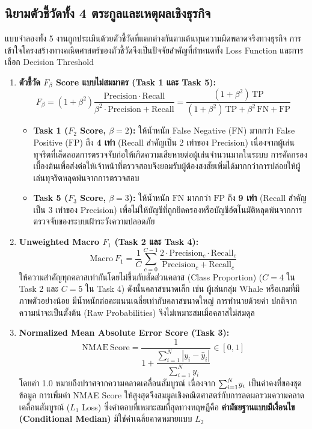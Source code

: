 \documentclass[11pt,a4paper]{article}
\DeclareRobustCommand{\code}[1]{\leavevmode{\ttfamily\color{KeyGreen!85!black}\let\codeunderscore\_\def\_{\codeunderscore\allowbreak}\hyphenpenalty=50\exhyphenpenalty=50\relax#1}}
\begin{document}
\subsection{นิยามตัวชี้วัดทั้ง 4 ตระกูลและเหตุผลเชิงธุรกิจ}

แบบจำลองทั้ง 5 งานถูกประเมินด้วยตัวชี้วัดที่แตกต่างกันตามต้นทุนความผิดพลาดจริงทางธุรกิจ การเข้าใจโครงสร้างทางคณิตศาสตร์ของตัวชี้วัดจึงเป็นปัจจัยสำคัญที่กำหนดทั้ง Loss Function และการเลือก Decision Threshold

\begin{enumerate}
    \item \textbf{ตัวชี้วัด $F_\beta$ Score แบบไม่สมมาตร (Task 1 และ Task 5):}
    \[
    F_\beta = (1 + \beta^2)\frac{\mathrm{Precision} \cdot \mathrm{Recall}}{\beta^2 \cdot \mathrm{Precision} + \mathrm{Recall}} = \frac{(1 + \beta^2)\,\mathrm{TP}}{(1 + \beta^2)\,\mathrm{TP} + \beta^2\,\mathrm{FN} + \mathrm{FP}}
    \]
    \begin{itemize}
        \item \textbf{Task 1 ($F_2$ Score, $\beta=2$):} ให้น้ำหนัก False Negative ($\mathrm{FN}$) มากกว่า False Positive ($\mathrm{FP}$) ถึง \textbf{4 เท่า} (Recall สำคัญเป็น 2 เท่าของ Precision) เนื่องจากผู้เล่นทุจริตที่เล็ดลอดการตรวจจับก่อให้เกิดความเสียหายต่อผู้เล่นจำนวนมากในระบบ การคัดกรองเบื้องต้นเพื่อส่งต่อให้เจ้าหน้าที่ตรวจสอบจึงยอมรับผู้ต้องสงสัยเพิ่มได้มากกว่าการปล่อยให้ผู้เล่นทุจริตหลุดพ้นจากการตรวจสอบ
        \item \textbf{Task 5 ($F_3$ Score, $\beta=3$):} ให้น้ำหนัก $\mathrm{FN}$ มากกว่า $\mathrm{FP}$ ถึง \textbf{9 เท่า} (Recall สำคัญเป็น 3 เท่าของ Precision) เพื่อไม่ให้บัญชีที่ถูกยึดครองหรือบัญชีอัตโนมัติหลุดพ้นจากการตรวจจับของระบบเฝ้าระวังความปลอดภัย
    \end{itemize}

    \item \textbf{Unweighted Macro $F_1$ (Task 2 และ Task 4):}
    \[
    \mathrm{Macro\ } F_1 = \frac{1}{C}\sum_{c=0}^{C-1} \frac{2 \cdot \mathrm{Precision}_c \cdot \mathrm{Recall}_c}{\mathrm{Precision}_c + \mathrm{Recall}_c}
    \]
    ให้ความสำคัญทุกคลาสเท่ากันโดยไม่ขึ้นกับสัดส่วนคลาส (Class Proportion) ($C=4$ ใน Task 2 และ $C=5$ ใน Task 4) ดังนั้นคลาสขนาดเล็ก เช่น ผู้เล่นกลุ่ม Whale หรือเกมที่มีภาพตัวอย่างน้อย มีน้ำหนักต่อคะแนนเฉลี่ยเท่ากับคลาสขนาดใหญ่ การทำนายด้วยค่า \code{argmax} ปกติจากความน่าจะเป็นตั้งต้น (Raw Probabilities) จึงไม่เหมาะสมเมื่อคลาสไม่สมดุล

    \item \textbf{Normalized Mean Absolute Error Score (Task 3):}
    \[
    \mathrm{NMAE\ Score} = \frac{1}{1 + \dfrac{\sum_{i=1}^{N} |y_i - \hat{y}_i|}{\sum_{i=1}^{N} y_i}} \in [0, 1]
    \]
    โดยค่า 1.0 หมายถึงปราศจากความคลาดเคลื่อนสัมบูรณ์ เนื่องจาก $\smash{\sum_{i=1}^N} y_i$ เป็นค่าคงที่ของชุดข้อมูล การเพิ่มค่า NMAE Score ให้สูงสุดจึงสมมูลเชิงคณิตศาสตร์กับการลดผลรวมความคลาดเคลื่อนสัมบูรณ์ ($L_1$ Loss) ซึ่งคำตอบที่เหมาะสมที่สุดทางทฤษฎีคือ \textbf{ค่ามัธยฐานแบบมีเงื่อนไข (Conditional Median)} มิใช่ค่าเฉลี่ยคาดหมายแบบ $L_2$


\end{enumerate}
\end{document}
